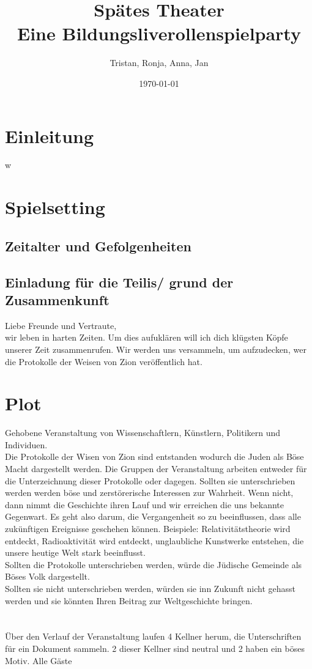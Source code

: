 \documentclass[12pt, a4paper, openany]{report}
\title{
    {Spätes Theater}\\
    {\large{Eine Bildungsliverollenspielparty}}\\
}
\author{Tristan, Ronja, Anna, Jan}
\date{\today}
\begin{document}
\maketitle
\frontmatter
\tableofcontents
\mainmatter

\chapter{Einleitung}

w

\chapter{Spielsetting}

\section{Zeitalter und Gefolgenheiten}

\section{Einladung für die Teilis/ grund der Zusammenkunft}
Liebe Freunde und Vertraute,\\
wir leben in harten Zeiten. 
Um dies aufuklären will ich dich klügsten Köpfe unserer Zeit zusammenrufen. 
Wir werden uns versammeln, um aufzudecken, wer die Protokolle der Weisen von Zion veröffentlich hat. 

\chapter{Plot}

Gehobene Veranstaltung von Wissenschaftlern, Künstlern, Politikern und Individuen.\\
Die Protokolle der Wisen von Zion sind entstanden wodurch die Juden als Böse Macht dargestellt werden. 
Die Gruppen der Veranstaltung arbeiten entweder für die Unterzeichnung dieser Protokolle oder dagegen.
Sollten sie unterschrieben werden werden böse und zerstörerische Interessen zur Wahrheit.
Wenn nicht, dann nimmt die Geschichte ihren Lauf und wir erreichen die uns bekannte Gegenwart.
Es geht also darum, die Vergangenheit so zu beeinflussen, dass alle zukünftigen Ereignisse geschehen können.
Beispiele: Relativitätstheorie wird entdeckt, Radioaktivität wird entdeckt, unglaubliche Kunstwerke entstehen, die unsere heutige Welt stark beeinflusst.\\
Sollten die Protokolle unterschrieben werden, würde die Jüdische Gemeinde als Böses Volk dargestellt.\\
Sollten sie nicht unterschrieben werden, würden sie inn Zukunft nicht gehasst werden und sie könnten Ihren Beitrag zur Weltgeschichte bringen.\\\\\\
Über den Verlauf der Veranstaltung laufen 4 Kellner herum, die Unterschriften für ein Dokument sammeln. 2 dieser Kellner sind neutral und 2 haben ein böses Motiv.
Alle Gäste
\end{document}
